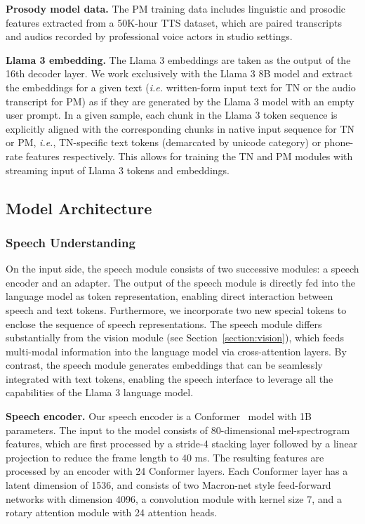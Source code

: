 \textbf{Prosody model data.} The PM training data includes linguistic and prosodic features extracted from a 50K-hour TTS dataset, which are paired transcripts and audios recorded by professional voice actors in studio settings.

\textbf{Llama 3 embedding.} The Llama 3 embeddings are taken as the output of the 16th decoder layer. We work exclusively with the Llama 3 8B model and extract the embeddings for a given text (\emph{i.e.} written-form input text for TN or the audio transcript for PM) as if they are generated by the Llama 3 model with an empty user prompt. In a given sample, each chunk in the Llama 3 token sequence is explicitly aligned with the corresponding chunks in native input sequence for TN or PM, \emph{i.e.}, TN-specific text tokens (demarcated by unicode category) or phone-rate features respectively. This allows for training the TN and PM modules with streaming input of Llama 3 tokens and embeddings.

\subsection{Model Architecture}

\subsubsection{Speech Understanding}

On the input side, the speech module consists of two successive modules: a speech encoder and an adapter. The output of the speech module is directly fed into the language model as token representation, enabling direct interaction between speech and text tokens. Furthermore, we incorporate two new special tokens to enclose the sequence of speech representations. The speech module differs substantially from the vision module (see Section~\ref{section:vision}), which feeds multi-modal information into the language model via cross-attention layers. By contrast, the speech module generates embeddings that can be seamlessly integrated with text tokens, enabling the speech interface to leverage all the capabilities of the Llama 3 language model.

\textbf{Speech encoder.} Our speech encoder is a Conformer~\citep{gulati2020conformer} model with 1B parameters. The input to the model consists of 80-dimensional mel-spectrogram features, which are first processed by a stride-4 stacking layer followed by a linear projection to reduce the frame length to 40 ms. The resulting features are processed by an encoder with 24 Conformer layers. Each Conformer layer has a latent dimension of 1536, and consists of two Macron-net style feed-forward networks with dimension 4096, a convolution module with kernel size 7, and a rotary attention module \citep{su2024roformer} with 24 attention heads.


